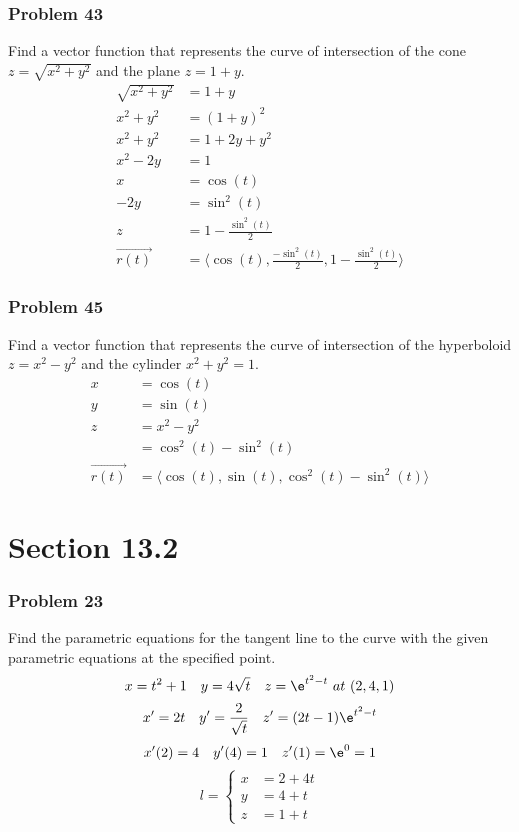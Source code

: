 \documentclass[letterpaper, 12pt]{math}
\begin{document}
\subsubsection*{Problem 43}
Find a vector function that represents the curve of intersection of the cone
\( z = \sqrt{x^2+y^2} \) and the plane \( z = 1+y \).
\begin{align*}
  \sqrt{x^2+y^2} &= 1+y \\
  x^2+y^2 &= (1+y)^2 \\
  x^2+y^2 &= 1+2y+y^2 \\
  x^2-2y &= 1 \\
  x &= \cos(t) \\
  -2y &= \sin^2(t) \\
  z &= 1-\frac{\sin^2(t)}{2} \\
  \overrightarrow{r(t)} &=
    \langle\cos(t),\frac{-\sin^2(t)}{2},1-\frac{\sin^2(t)}{2}\rangle
\end{align*}

\subsubsection*{Problem 45}
Find a vector function that represents the curve of intersection of the
hyperboloid \( z = x^2-y^2 \) and the cylinder \( x^2+y^2 = 1 \).
\begin{align*}
  x &= \cos(t) \\
  y &= \sin(t) \\
  z &= x^2-y^2 \\
  &= \cos^2(t)-\sin^2(t) \\
  \overrightarrow{r(t)} &= \langle\cos(t),\sin(t),\cos^2(t)-\sin^2(t)\rangle
\end{align*}

\section*{Section 13.2}

\subsubsection*{Problem 23}
Find the parametric equations for the tangent line to the curve with the
given parametric equations at the specified point.
\[ x = t^2+1 \quad y = 4\sqrt{t} \quad z = \e^{t^2-t}\ at\ (2,4,1) \]
\[ x' = 2t \quad y' = \frac{2}{\sqrt{t}} \quad z' = (2t-1)\e^{t^2-t} \]
\[ x'(2) = 4 \quad y'(4) = 1 \quad z'(1) = \e^0 = 1 \]
\[ l = \begin{cases}
  x &= 2+4t \\
  y &= 4+t \\
  z &= 1+t
\end{cases} \]
\end{document}
